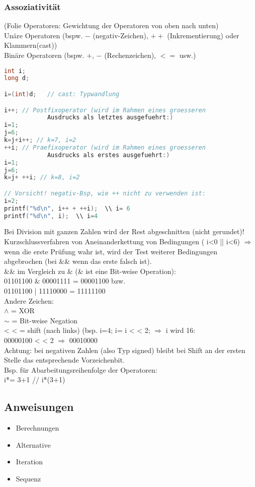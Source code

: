 \subsubsection{Assoziativität}
(Folie Operatoren: Gewichtung der Operatoren von oben nach unten)\medskip\\
Unäre Operatoren (bspw. $-$ (negativ-Zeichen), $++$ (Inkrementierung) oder Klammern(cast))\\
Binäre Operatoren (bspw. $+$, $-$ (Rechenzeichen), $<=$ usw.)
\begin{lstlisting}[language=C]
int i;
long d;

i=(int)d;	// cast: Typwandlung

i++; // Postfixoperator (wird im Rahmen eines groesseren 
			Ausdrucks als letztes ausgefuehrt:)
i=1;
j=6;
k=j+i++; // k=7, i=2
++i; // Praefixoperator (wird im Rahmen eines groesseren 
			Ausdrucks als erstes ausgefuehrt:)
i=1;
j=6;
k=j+ ++i; // k=8, i=2

// Vorsicht! negativ-Bsp, wie ++ nicht zu verwenden ist:
i=2;
printf("%d\n", i++ + ++i);	\\ i= 6
printf("%d\n", i);	\\ i=4
\end{lstlisting}
Bei Division mit ganzen Zahlen wird der Rest abgeschnitten (nicht gerundet)!\medskip\\
Kurzschlussverfahren von Aneinanderkettung von Bedingungen ( i<0 || i<6) $\Rightarrow$ wenn die erste Prüfung wahr ist, wird der Test weiterer Bedingungen abgebrochen (bei \&\& wenn das erste falsch ist).\bigskip\\
\&\& im Vergleich zu \& (\& ist eine Bit-weise Operation): \\
01101100 \& 00001111 = 00001100 bzw. \\
01101100 | 11110000 = 11111100 \smallskip\\
Andere Zeichen: \\
$\wedge$ = XOR\\
$\sim$ = Bit-weise Negation\\
<\! < = shift (nach links) (bsp. i=4; i= i <\! < 2; $\Rightarrow$ i wird 16:\\
00000100 <\! < 2 $\Rightarrow$ 00010000\\
Achtung: bei negativen Zahlen (also Typ signed) bleibt bei Shift an der ersten Stelle das entsprechende Vorzeichenbit.\\
Bsp. für Abarbeitungsreihenfolge der Operatoren:\\
i*= 3+1		// i*(3+1)
\subsection{Anweisungen}
\begin{itemize}
\item Berechnungen
\item Alternative
\item Iteration
\item Sequenz
\end{itemize}

